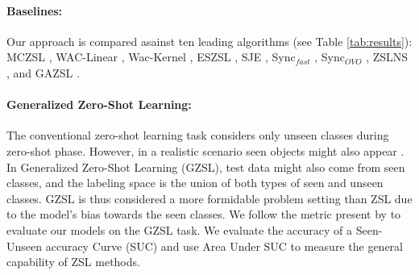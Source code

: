 \documentclass[11pt,a4paper]{article}
\begin{document}
\paragraph{Baselines:}  
Our approach is compared asainst ten leading algorithms (see Table \ref{tab:results}): MCZSL \citep{akata2016multi}, WAC-Linear  \citep{elhoseiny2013write}, Wac-Kernel   \citep{elhoseiny2016write}, ESZSL     \citep{romera2015embarrassingly}, SJE   \citep{akata2015evaluation}, Sync$_{fast}$ \citep{changpinyo2016synthesized}, Sync$_{OVO}$ \citep{changpinyo2016synthesized},
ZSLNS \citep{qiao2016less}, and GAZSL \citep{zhu2018generative}. 


\paragraph{Generalized Zero-Shot Learning:} 
The conventional zero-shot learning task considers only unseen classes during zero-shot phase. However, in a realistic scenario seen objects might also appear \cite{chao2016empirical}. In Generalized Zero-Shot Learning (GZSL), test data might also come from seen classes, and the labeling space is the union of both types of seen and unseen classes. GZSL is thus considered a more formidable problem setting
than ZSL due to the model's bias towards the seen classes.
We follow the metric present by \citet{chao2016empirical} to evaluate our models on the GZSL task. We evaluate the accuracy of a Seen-Unseen accuracy Curve (SUC) and use Area Under  SUC to measure the general capability of ZSL methods.
\end{document}
